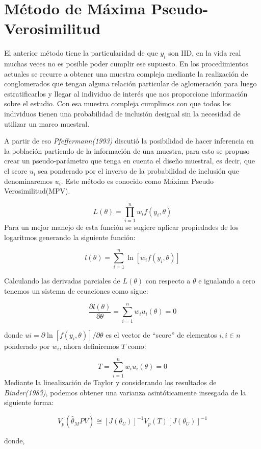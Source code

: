 \documentclass[
  spanish,
  12pt,
]{book}
\begin{document}
\section{Método de Máxima Pseudo-Verosimilitud}\label{muxe9todo-de-muxe1xima-pseudo-verosimilitud}

El anterior método tiene la particularidad de que \(y_{i}\) son IID, en la vida real muchas veces no es posible poder cumplir ese supuesto. En los procedimientos actuales se recurre a obtener una muestra compleja mediante la realización de conglomerados que tengan alguna relación particular de aglomeración para luego estratificarlos y llegar al individuo de interés que nos proporcione información sobre el estudio. Con esa muestra compleja cumplimos con que todos los individuos tienen una probabilidad de inclusión desigual sin la necesidad de utilizar un marco muestral.

A partir de eso \emph{Pfeffermann(1993)} discutió la posibilidad de hacer inferencia en la población partiendo de la información de una muestra, para esto se propuso crear un pseudo-parámetro que tenga en cuenta el diseño muestral, es decir, que el score \(u_{i}\) sea ponderado por el inverso de la probabilidad de inclusión que denominaremos \(u_{i}\). Este método es conocido como Máxima Pseudo Verosimilitud(MPV).

\[
L(\theta)=\prod_{i=1}^{n}w_{i}f(y_{i},\theta)
\]
Para un mejor manejo de esta función se sugiere aplicar propiedades de los logaritmos generando la siguiente función:

\[
l(\theta)=\sum_{i=1}^{n}\ln[w_{i}f(y_{i},\theta)]
\]

Calculando las derivadas parciales de \(L(\theta)\) con respecto a \(\theta\) e igualando a cero tenemos un sistema de ecuaciones como sigue:

\[
\dfrac{\partial l(\theta)}{\partial\theta}=\sum_{i=1}^{n}w_{i}u_{i}(\theta)=0
\]

donde \(ui=\partial\ln[f(y_{i},\theta)]/\partial\theta\) es el vector de ``score'' de elementos \(i,i\in n\) ponderado por \(w_{i}\), ahora definiremos \(T\) como:

\[
T=\sum_{i=1}^{n}w_{i}u_{i}(\theta)=0
\]
Mediante la linealización de Taylor y considerando los resultados de \emph{Binder(1983)}, podemos obtener una varianza asintóticamente insesgada de la siguiente forma:

\[
V_{p}(\hat{\theta}_{M}PV)\cong[J(\theta_{U})]^{-1}V_{p}(T)[J(\theta_{U})]^{-1}
\]

donde,
\end{document}
